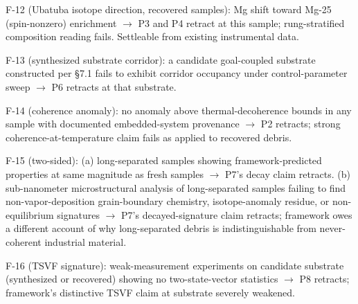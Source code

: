 \documentclass[11pt,a4paper]{article}
\begin{document}
F-12 (Ubatuba isotope direction, recovered samples): Mg shift toward Mg-25 (spin-nonzero) enrichment $\to$ P3 and P4 retract at this sample; rung-stratified composition reading fails. Settleable from existing instrumental data.

F-13 (synthesized substrate corridor): a candidate goal-coupled substrate constructed per \S7.1 fails to exhibit corridor occupancy under control-parameter sweep $\to$ P6 retracts at that substrate.

F-14 (coherence anomaly): no anomaly above thermal-decoherence bounds in any sample with documented embedded-system provenance $\to$ P2 retracts; strong coherence-at-temperature claim fails as applied to recovered debris.

F-15 (two-sided): (a) long-separated samples showing framework-predicted properties at same magnitude as fresh samples $\to$ P7's decay claim retracts. (b) sub-nanometer microstructural analysis of long-separated samples failing to find non-vapor-deposition grain-boundary chemistry, isotope-anomaly residue, or non-equilibrium signatures $\to$ P7's decayed-signature claim retracts; framework owes a different account of why long-separated debris is indistinguishable from never-coherent industrial material.

F-16 (TSVF signature): weak-measurement experiments on candidate substrate (synthesized or recovered) showing no two-state-vector statistics $\to$ P8 retracts; framework's distinctive TSVF claim at substrate severely weakened.
\end{document}
